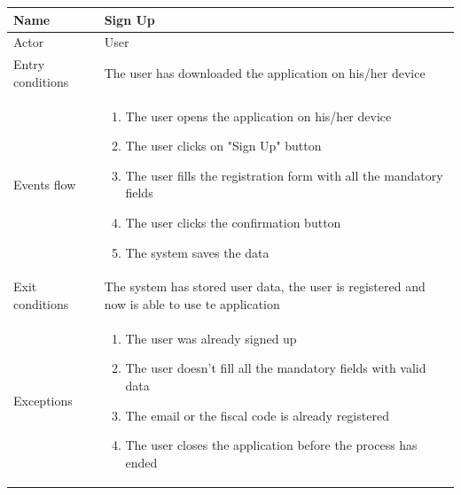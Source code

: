 \documentclass{article}
\begin{document}
\begin{table}[H]
    \begin{tabular}{|l|l|}
    \hline
    Name & \textbf{Sign Up} \\ \hline  
    Actor & User\\ \hline 
    Entry conditions &  The user has downloaded the application on his/her
    device\\ \hline 
    Events flow & 
    \begin{minipage}[t]{0.7\textwidth}
    \begin{enumerate}
        \item The user opens the application on his/her device
        \item The user clicks on "Sign Up" button
        \item The user fills the registration form with all the mandatory fields
        \item The user clicks the confirmation button
        \item The system saves the data
    \end{enumerate}
    \end{minipage} \\ \hline
    Exit conditions & \begin{minipage}[t]{0.7\textwidth}The system has stored
    user data, the user is registered and now is able to use te application
    \end{minipage}\\ \hline
    Exceptions & \begin{minipage}[t]{0.7\textwidth} \begin{enumerate}
        \item The user was already signed up
        \item The user doesn't fill all the mandatory fields with valid data
        \item The email or the fiscal code is already registered
        \item The user closes the application before the process has ended
    \end{enumerate}\end{minipage} \\ \hline
    \end{tabular}
\end{table}
\end{document}
